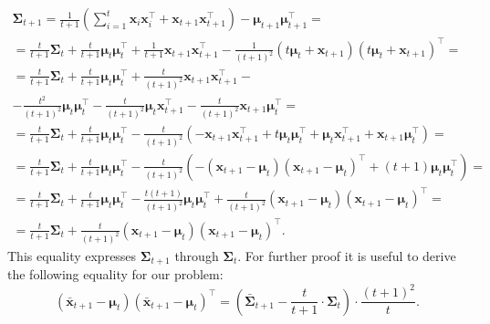\documentclass[12pt]{article}
\begin{document}
{\begin{enumerate}
	\begin{gather*}
		\mathbf{\Sigma}_{t+1} = \frac{1}{t+1} \left(\sum_{i=1}^{t} \mathbf{x}_i \mathbf{x}_i^\intercal + \mathbf{x}_{t+1} \mathbf{x}_{t+1}^\intercal \right) - \boldsymbol{\mu}_{t+1} \boldsymbol{\mu}_{t+1}^\intercal = \\
		= \frac{t}{t+1}\mathbf{\Sigma}_t + \frac{t}{t+1}\boldsymbol{\mu}_{t} \boldsymbol{\mu}_{t}^\intercal + \frac{1}{t+1} \mathbf{x}_{t+1} \mathbf{x}_{t+1}^\intercal - \frac{1}{(t+1)^2} (t \boldsymbol{\mu}_t + \mathbf{x}_{t+1})(t \boldsymbol{\mu}_t + \mathbf{x}_{t+1})^\intercal =\\
		= \frac{t}{t+1}\mathbf{\Sigma}_t + \frac{t}{t+1}\boldsymbol{\mu}_{t} \boldsymbol{\mu}_{t}^\intercal + \frac{t}{(t+1)^2} \mathbf{x}_{t+1} \mathbf{x}_{t+1}^\intercal -\\- \frac{t^2}{(t+1)^2}\boldsymbol{\mu}_{t} \boldsymbol{\mu}_{t}^\intercal - \frac{t}{(t+1)^2}\boldsymbol{\mu}_{t} \mathbf{x}_{t+1}^\intercal - \frac{t}{(t+1)^2}\mathbf{x}_{t+1} \boldsymbol{\mu}_{t}^\intercal =\\
		= \frac{t}{t+1}\mathbf{\Sigma}_t + \frac{t}{t+1}\boldsymbol{\mu}_{t} \boldsymbol{\mu}_{t}^\intercal - \frac{t}{(t+1)^2} \left( -\mathbf{x}_{t+1} \mathbf{x}_{t+1}^\intercal + t\boldsymbol{\mu}_{t} \boldsymbol{\mu}_{t}^\intercal + \boldsymbol{\mu}_{t} \mathbf{x}_{t+1}^\intercal + \mathbf{x}_{t+1} \boldsymbol{\mu}_{t}^\intercal \right) =\\
		= \frac{t}{t+1}\mathbf{\Sigma}_t + \frac{t}{t+1}\boldsymbol{\mu}_{t} \boldsymbol{\mu}_{t}^\intercal - \frac{t}{(t+1)^2} \left( -(\mathbf{x}_{t+1}-\boldsymbol{\mu}_t)(\mathbf{x}_{t+1}-\boldsymbol{\mu}_t)^\intercal + (t+1)\boldsymbol{\mu}_{t} \boldsymbol{\mu}_{t}^\intercal \right) =\\
		= \frac{t}{t+1}\mathbf{\Sigma}_t + \frac{t}{t+1}\boldsymbol{\mu}_{t} \boldsymbol{\mu}_{t}^\intercal - \frac{t(t+1)}{(t+1)^2}\boldsymbol{\mu}_{t} \boldsymbol{\mu}_{t}^\intercal + \frac{t}{(t+1)^2}(\mathbf{x}_{t+1}-\boldsymbol{\mu}_t)(\mathbf{x}_{t+1}-\boldsymbol{\mu}_t)^\intercal =\\
		= \frac{t}{t+1}\mathbf{\Sigma}_t + \frac{t}{(t+1)^2}(\mathbf{x}_{t+1}-\boldsymbol{\mu}_t)(\mathbf{x}_{t+1}-\boldsymbol{\mu}_t)^\intercal.
	\end{gather*}
	This equality expresses $\mathbf{\Sigma}_{t+1}$ through $\mathbf{\Sigma}_t$. For further proof it is useful to derive the following equality for our problem: \[(\bar{\mathbf{x}}_{t+1}-\boldsymbol{\mu}_t)(\bar{\mathbf{x}}_{t+1}-\boldsymbol{\mu}_t)^\intercal = \left(\bar{\mathbf{\Sigma}}_{t+1} - \frac{t}{t+1} \cdot \mathbf{\Sigma}_t \right) \cdot \frac{(t+1)^2}{t}.\]
	

\end{enumerate}}
\end{document}
